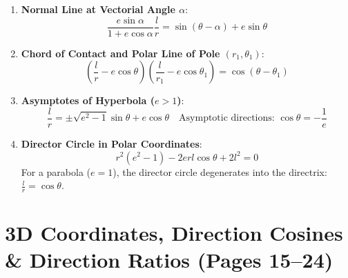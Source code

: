\begin{theorembox}
\begin{enumerate}
    \item \textbf{Normal Line at Vectorial Angle $\alpha$}:
    \begin{equation}
        \boxed{\frac{e\sin\alpha}{1 + e\cos\alpha}\frac{l}{r} = \sin(\theta - \alpha) + e\sin\theta}
    \end{equation}
    \item \textbf{Chord of Contact and Polar Line of Pole $(r_1, \theta_1)$}:
    \begin{equation}
        \boxed{\left(\frac{l}{r} - e\cos\theta\right)\left(\frac{l}{r_1} - e\cos\theta_1\right) = \cos(\theta - \theta_1)}
    \end{equation}
    \item \textbf{Asymptotes of Hyperbola ($e > 1$)}:
    \begin{equation}
        \boxed{\frac{l}{r} = \pm\sqrt{e^2 - 1}\sin\theta + e\cos\theta} \quad \text{Asymptotic directions: } \cos\theta = -\frac{1}{e}
    \end{equation}
    \item \textbf{Director Circle in Polar Coordinates}:
    \begin{equation}
        \boxed{r^2(e^2 - 1) - 2erl\cos\theta + 2l^2 = 0}
    \end{equation}
    For a parabola ($e = 1$), the director circle degenerates into the directrix: $\displaystyle \frac{l}{r} = \cos\theta$.
\end{enumerate}
\end{theorembox}

\section{3D Coordinates, Direction Cosines \& Direction Ratios (Pages 15--24)}

